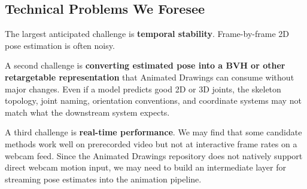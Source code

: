
\subsection*{Technical Problems We Foresee}

The largest anticipated challenge is \textbf{temporal stability}. Frame-by-frame 2D pose estimation is often noisy. 

A second challenge is \textbf{converting estimated pose into a BVH or other retargetable representation} that Animated Drawings can consume without major changes. Even if a model predicts good 2D or 3D joints, the skeleton topology, joint naming, orientation conventions, and coordinate systems may not match what the downstream system expects.


A third challenge is \textbf{real-time performance}. We may find that some candidate methods work well on prerecorded video but not at interactive frame rates on a webcam feed. Since the Animated Drawings repository does not natively support direct webcam motion input, we may need to build an intermediate layer for streaming pose estimates into the animation pipeline.




\newpage


